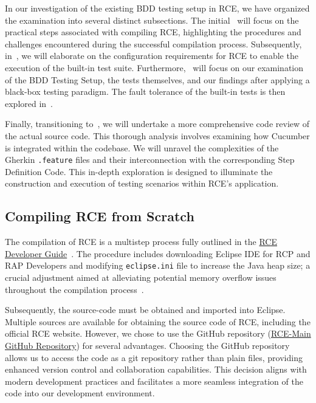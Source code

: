 \label{sec:examination}
In our investigation of the existing BDD testing setup in \ac{RCE}, we have organized the examination into several distinct subsections. The initial~ will focus on the practical steps associated with compiling \ac{RCE}, highlighting the procedures and challenges encountered during the successful compilation process. Subsequently, in~, we will elaborate on the configuration requirements for \ac{RCE} to enable the execution of the built-in test suite. Furthermore,~ will focus on our examination of the BDD Testing Setup, the tests themselves, and our findings after applying a black-box testing paradigm. The fault tolerance of the built-in tests is then explored in~.

Finally, transitioning to~, we will undertake a more comprehensive code review of the actual source code. This thorough analysis involves examining how Cucumber is integrated within the codebase. We will unravel the complexities of the Gherkin \texttt{.feature} files and their interconnection with the corresponding Step Definition Code. This in-depth exploration is designed to illuminate the construction and execution of testing scenarios within \ac{RCE}'s application.

\subsection{Compiling \ac{RCE} from Scratch}
\label{subsec:BuildingRCE}
The compilation of \ac{RCE} is a multistep process fully outlined in the \href{https://rcenvironment.de/pages/documentation/documentation.html}{RCE Developer Guide}~\cite{rceDevGuide10x}. The procedure includes downloading Eclipse IDE for RCP and RAP Developers and modifying \texttt{eclipse.ini} file to increase the Java heap size; a crucial adjustment aimed at alleviating potential memory overflow issues throughout the compilation process~\cite{rceDevGuide10x}.

Subsequently, the source-code must be obtained and imported into Eclipse. Multiple sources are available for obtaining the source code of \ac{RCE}, including the official RCE website. However, we chose to use the GitHub repository (\href{https://github.com/rcenvironment/rce-main}{RCE-Main GitHub Repository}) for several advantages. Choosing the GitHub repository allows us to access the code as a git repository rather than plain files, providing enhanced version control and collaboration capabilities. This decision aligns with modern development practices and facilitates a more seamless integration of the code into our development environment. 

